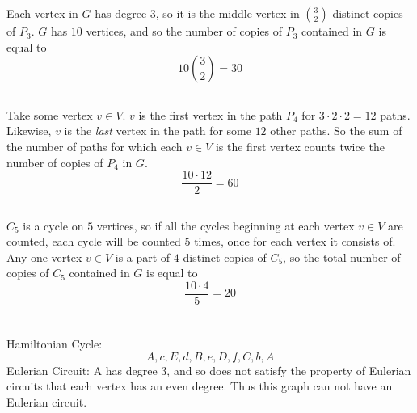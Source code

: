 \documentclass{article}
\begin{document}
\section{} %
\subsection{}
Each vertex in $G$ has degree 3, so it is the middle vertex in $\binom{3}{2}$ distinct copies of $P_3$.
$G$ has $10$ vertices, and so the number of copies of $P_3$ contained in $G$ is equal to
\[10\binom{3}{2}=30\]
\subsection{}
Take some vertex $v\in{V}$. $v$ is the first vertex in the path $P_4$ for $3\cdot2\cdot2=12$ paths. Likewise, $v$ is the \textit{last} vertex
in the path for some $12$ other paths. So the sum of the number of paths for which each $v\in{V}$ is the first vertex counts twice the number
of copies of $P_4$ in $G$.
\[\dfrac{10\cdot12}{2}=60\]
\subsection{}
$C_5$ is a cycle on $5$ vertices, so if all the cycles beginning at each vertex $v\in{V}$ are counted, each cycle will be counted $5$ times, once
for each vertex it consists of. Any one vertex $v\in{V}$ is a part of $4$ distinct copies of $C_5$, so the total number of copies of $C_5$ contained in
$G$ is equal to
\[\dfrac{10\cdot4}{5}=20\]

\section{} %
\subsection{}
\newline
Hamiltonian Cycle:
\[A,c,E,d,B,e,D,f,C,b,A\]
Eulerian Circuit:
A has degree 3, and so does not satisfy the property of Eulerian circuits that each vertex has an even degree. Thus this graph can not have an Eulerian circuit.
\end{document}
